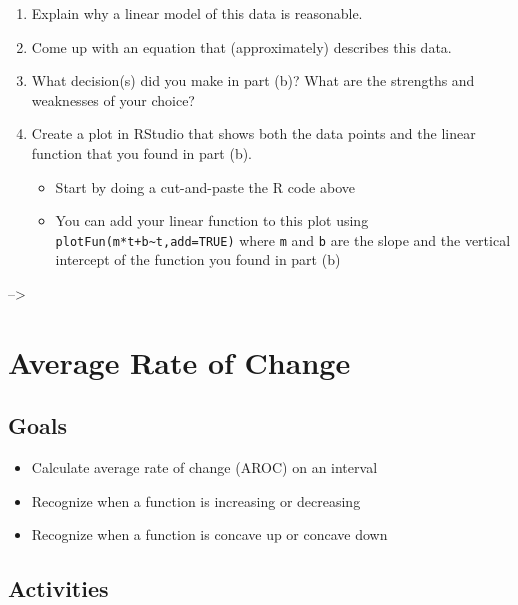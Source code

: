 \documentclass[
]{book}
\providecommand{\tightlist}{%
  \setlength{\itemsep}{0pt}\setlength{\parskip}{0pt}}
\begin{document}
\begin{enumerate}
\def\labelenumi{\arabic{enumi}.}
\tightlist
\item
  Explain why a linear model of this data is reasonable.
\item
  Come up with an equation that (approximately) describes this data.
\item
  What decision(s) did you make in part (b)? What are the strengths and weaknesses of your choice?
\item
  Create a plot in RStudio that shows both the data points and the linear function that you found in part (b).

  \begin{itemize}
  \tightlist
  \item
    Start by doing a cut-and-paste the R code above
  \item
    You can add your linear function to this plot using \texttt{plotFun(m*t+b\textasciitilde{}t,add=TRUE)} where \texttt{m} and \texttt{b} are the slope and the vertical intercept of the function you found in part (b)
  \end{itemize}
\end{enumerate}

--\textgreater{}

\hypertarget{average-rate-of-change}{%
\chapter{Average Rate of Change}\label{average-rate-of-change}}

\hypertarget{goals-2}{%
\section{Goals}\label{goals-2}}

\begin{itemize}
\tightlist
\item
  Calculate average rate of change (AROC) on an interval
\item
  Recognize when a function is increasing or decreasing
\item
  Recognize when a function is concave up or concave down
\end{itemize}

\hypertarget{activities-2}{%
\section{Activities}\label{activities-2}}
\end{document}
